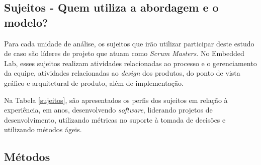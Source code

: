 \subsection{Sujeitos - Quem utiliza a abordagem e o modelo?}
\label{estudodecaso:design:sujeitos}

Para cada unidade de análise, os sujeitos que irão utilizar participar deste estudo de caso são líderes de projeto que atuam como \textit{Scrum Masters}. No Embedded Lab, esses sujeitos realizam atividades relacionadas ao processo e o gerenciamento da equipe, atividades relacionadas ao \textit{design} dos produtos, do ponto de vista gráfico e arquitetural de produto, além de implementação.

Na Tabela \ref{sujeitos}, são apresentados os perfis dos sujeitos em relação à experiência, em anos, desenvolvendo \textit{software}, liderando projetos de desenvolvimento, utilizando métricas no suporte à tomada de decisões e utilizando métodos ágeis.

\begin{table}[ht!]
\centering
\caption{Perfis dos Sujeitos.}
\label{sujeitos}
\end{table}

\subsection{Métodos}
\label{estudodecaso:design:metodos}

